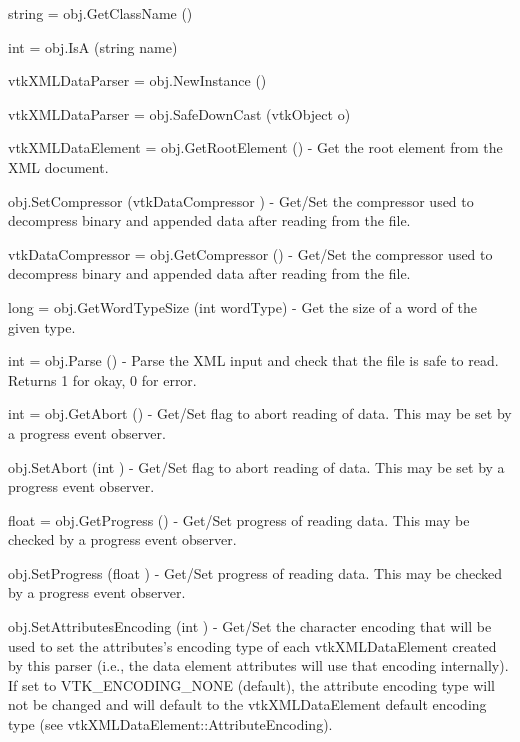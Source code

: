 \begin{DoxyItemize}
\item {\ttfamily string = obj.\-Get\-Class\-Name ()}  
\item {\ttfamily int = obj.\-Is\-A (string name)}  
\item {\ttfamily vtk\-X\-M\-L\-Data\-Parser = obj.\-New\-Instance ()}  
\item {\ttfamily vtk\-X\-M\-L\-Data\-Parser = obj.\-Safe\-Down\-Cast (vtk\-Object o)}  
\item {\ttfamily vtk\-X\-M\-L\-Data\-Element = obj.\-Get\-Root\-Element ()} -\/ Get the root element from the X\-M\-L document.  
\item {\ttfamily obj.\-Set\-Compressor (vtk\-Data\-Compressor )} -\/ Get/\-Set the compressor used to decompress binary and appended data after reading from the file.  
\item {\ttfamily vtk\-Data\-Compressor = obj.\-Get\-Compressor ()} -\/ Get/\-Set the compressor used to decompress binary and appended data after reading from the file.  
\item {\ttfamily long = obj.\-Get\-Word\-Type\-Size (int word\-Type)} -\/ Get the size of a word of the given type.  
\item {\ttfamily int = obj.\-Parse ()} -\/ Parse the X\-M\-L input and check that the file is safe to read. Returns 1 for okay, 0 for error.  
\item {\ttfamily int = obj.\-Get\-Abort ()} -\/ Get/\-Set flag to abort reading of data. This may be set by a progress event observer.  
\item {\ttfamily obj.\-Set\-Abort (int )} -\/ Get/\-Set flag to abort reading of data. This may be set by a progress event observer.  
\item {\ttfamily float = obj.\-Get\-Progress ()} -\/ Get/\-Set progress of reading data. This may be checked by a progress event observer.  
\item {\ttfamily obj.\-Set\-Progress (float )} -\/ Get/\-Set progress of reading data. This may be checked by a progress event observer.  
\item {\ttfamily obj.\-Set\-Attributes\-Encoding (int )} -\/ Get/\-Set the character encoding that will be used to set the attributes's encoding type of each vtk\-X\-M\-L\-Data\-Element created by this parser (i.\-e., the data element attributes will use that encoding internally). If set to V\-T\-K\-\_\-\-E\-N\-C\-O\-D\-I\-N\-G\-\_\-\-N\-O\-N\-E (default), the attribute encoding type will not be changed and will default to the vtk\-X\-M\-L\-Data\-Element default encoding type (see vtk\-X\-M\-L\-Data\-Element\-::\-Attribute\-Encoding).  

\end{DoxyItemize}
